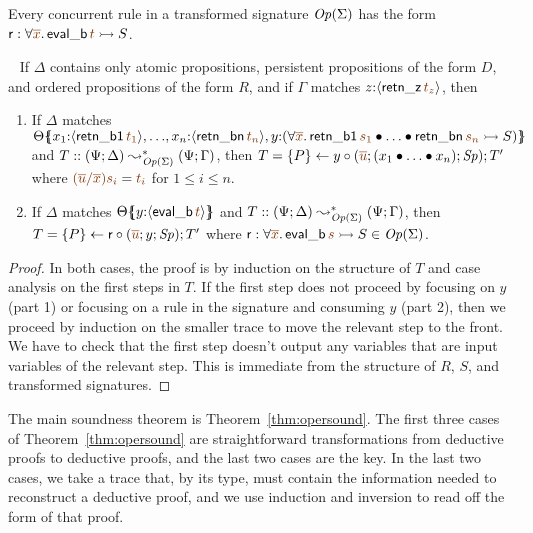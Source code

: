 \noindent
Every concurrent rule in a transformed signature
${\it Op}({\Sigma})$ has the form ${\sf r} : \forall \lf{\overline{x}}.\,
{\sf eval\_b}\,\lf{t} \lefti S$. 



\bigskip
\begin{theorem}[Rearrangement]\label{thm:rearrangement}~
If $\Delta$ contains only atomic propositions, persistent propositions
of the form $D$, and ordered 
propositions of the form $R$, and if $\Gamma$ matches
$z{:}\susp{{\sf retn\_z}\,\lf{t_z}}$, 
then 
\begin{enumerate}
\item If $\Delta$ matches 
$\frameoff{\Theta}
 {\matchconj
  {x_1{:}\susp{{\sf retn\_b1}\,\lf{t_1}}}
  {\matchconj
    {\ldots}
    {\matchconj 
      {x_n{:}\susp{{\sf retn\_bn}\,\lf{t_n}}}
      {y{:}{(\forall \lf{\overline{x}}.\,{\sf retn\_b1}\,\lf{s_1} \fuse \ldots \fuse {\sf retn\_bn}\,\lf{s_n} \lefti S)}}}}}$ and 
$T :: (\Psi; \Delta) \leadsto^*_{{\it Op}({\Sigma})}
(\Psi; \Gamma)$, then 
$T = \tstep{P}{y}{(\lf{\overline{u}}; (\tfuser{x_1}{\tfuser{\ldots}{x_n}}); \Sp)}; T'$
where $\lf{(\overline{u}/\overline{x})s_i} = \lf{t_i}$ for $1 \leq i \leq n$.
\item If $\Delta$ matches
$\frameoff{\Theta}
 {y{:}\susp{{\sf eval\_b}\,\lf{t}}}$ and 
$T :: (\Psi; \Delta) \leadsto^*_{{\it Op}({\Sigma})}
(\Psi; \Gamma)$, 
then 
$T = \tstep{P}{\sf r}{(\lf{\overline{u}}; y; \Sp)}; T'$
where 
${\sf r} : \forall \lf{\overline{x}}.\,{\sf eval\_b}\,\lf{s} \lefti S 
\in \transop{\Sigma}$.
\end{enumerate}
\end{theorem}

\begin{proof}
In both cases, the proof is by
induction on the structure of $T$ and case analysis on the first
steps in $T$. 
%
If the first step does not proceed by focusing on $y$ (part 1) or
focusing on a rule in the signature and consuming $y$ (part 2), then
we proceed by induction on the smaller trace to move the relevant step
to the front. We have to check that the first step doesn't output any
variables that are input variables of the relevant step.  This is
immediate from the structure of $R$, $S$, and transformed signatures.
\end{proof}

The main soundness theorem is Theorem~\ref{thm:opersound}. The first
three cases of Theorem~\ref{thm:opersound} are straightforward 
transformations from deductive proofs to deductive proofs, and the last
two cases are the key. In the last two cases, we take a trace that, by
its type, must contain the information needed to 
reconstruct a deductive proof, and we use induction and inversion to
read off the form of that proof.

